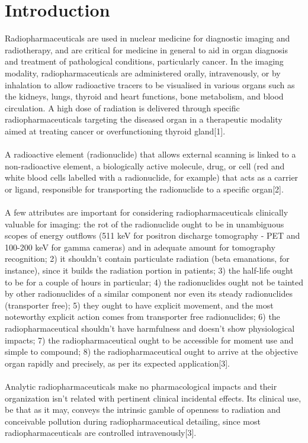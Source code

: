 \documentclass[12pt]{article}
\begin{document}
\section{Introduction}
Radiopharmaceuticals are used in nuclear medicine for diagnostic imaging and radiotherapy, and are critical for medicine in general to aid in organ diagnosis and treatment of pathological conditions, particularly cancer. In the imaging modality, radiopharmaceuticals are administered orally, intravenously, or by inhalation to allow radioactive tracers to be visualised in various organs such as the kidneys, lungs, thyroid and heart functions, bone metabolism, and blood circulation. A high dose of radiation is delivered through specific radiopharmaceuticals targeting the diseased organ in a therapeutic modality aimed at treating cancer or overfunctioning thyroid gland[1].
\\
\\
A radioactive element (radionuclide) that allows external scanning is linked to a non-radioactive element, a biologically active molecule, drug, or cell (red and white blood cells labelled with a radionuclide, for example) that acts as a carrier or ligand, responsible for transporting the radionuclide to a specific organ[2].
\\
\\
A few attributes are important for considering radiopharmaceuticals clinically valuable for imaging: the rot of the radionuclide ought to be in unambiguous scopes of energy outflows (511 keV for positron discharge tomography - PET and 100-200 keV for gamma cameras) and in adequate amount for tomography recognition; 2) it shouldn't contain particulate radiation (beta emanations, for instance), since it builds the radiation portion in patients; 3) the half-life ought to be for a couple of hours in particular; 4) the radionuclides ought not be tainted by other radionuclides of a similar component nor even its steady radionuclides (transporter free); 5) they ought to have explicit movement, and the most noteworthy explicit action comes from transporter free radionuclides; 6) the radiopharmaceutical shouldn't have harmfulness and doesn't show physiological impacts; 7) the radiopharmaceutical ought to be accessible for moment use and simple to compound; 8) the radiopharmaceutical ought to arrive at the objective organ rapidly and precisely, as per its expected application[3].
\\
\\
Analytic radiopharmaceuticals make no pharmacological impacts and their organization isn't related with pertinent clinical incidental effects. Its clinical use, be that as it may, conveys the intrinsic gamble of openness to radiation and conceivable pollution during radiopharmaceutical detailing, since most radiopharmaceuticals are controlled intravenously[3].
\end{document}
